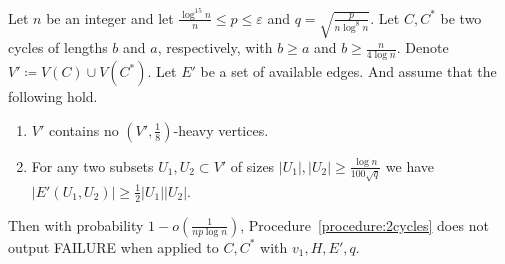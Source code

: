 \documentclass{article}
\begin{document}
	\begin{lemma}
		\label{lem:join2cycles}
		Let $n$ be an integer and let $\frac{\log^{15}n}{n} \le p \le \varepsilon$ and $q = \sqrt{\frac{p}{n \log^8 n}}$.
		Let $C, C^*$ be two cycles of lengths $b$ and $a$, respectively, with $b\ge a$ and $b \ge \frac{n}{4\log n}$.
		Denote $V' \coloneqq V(C) \cup V(C^*)$.
		Let $E'$ be a set of available edges.
		And assume that the following hold.
		\begin{enumerate}
			\item $V'$ contains no $\left(V', \frac{1}{8} \right)$-heavy vertices.
			\item For any two subsets $U_1, U_2 \subset V'$ of sizes $|U_1|, |U_2|\geq  \frac{\log n}{100\sqrt{q}}$ we have $\left|E'(U_1, U_2) \right| \ge \frac{1}{2}|U_1||U_2|$.
		\end{enumerate}
		Then with probability $1 - o\left(\frac{1}{np\log n} \right)$, Procedure~\ref{procedure:2cycles} does not output FAILURE when applied to $C,C^*$ with $v_1, H, E', q$.
	\end{lemma}
	
\end{document}
